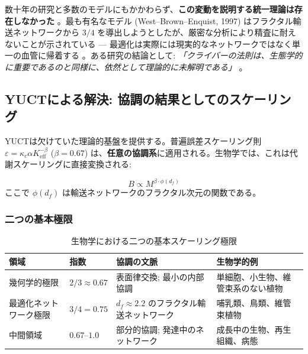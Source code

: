 \documentclass[12pt]{article}
\newcommand{\Keff}{K_{\mathrm{eff}}}
\begin{document}
	数十年の研究と多数のモデルにもかかわらず、\textbf{この変動を説明する統一理論は存在しなかった} \cite{Agutter2004}。最も有名なモデル (West–Brown–Enquist, 1997) はフラクタル輸送ネットワークから \(3/4\) を導出しようとしたが、厳密な分析により精査に耐えないことが示されている — 最適化は実際には現実的なネットワークではなく単一の血管に帰着する \cite{Dodds2001}。ある研究の結論として: \textit{「クライバーの法則は、生態学的に重要であるのと同様に、依然として理論的に未解明である」} \cite{Agutter2004}。
	
	\subsection{YUCTによる解決: 協調の結果としてのスケーリング}
	
	YUCTは欠けていた理論的基盤を提供する。普遍誤差スケーリング則 \(\varepsilon = \kappa_c \alpha \Keff^{-\beta}\) (\(\beta = 0.67\)) は、\textbf{任意の協調系}に適用される。生物学では、これは代謝スケーリングに直接変換される:
	
	\begin{equation}
		B \propto M^{\beta \cdot \phi(d_f)}
	\end{equation}
	ここで \(\phi(d_f)\) は輸送ネットワークのフラクタル次元の関数である。
	
	\subsubsection{二つの基本極限}
	
	\begin{table}[htbp]
		\centering
		\caption{生物学における二つの基本スケーリング極限}
		\label{tab:scaling-limits}
		\footnotesize
		\begin{tabular}{p{3cm} p{1.5cm} p{5cm} p{4cm}}
			\toprule
			\textbf{領域} & \textbf{指数} & \textbf{協調の文脈} & \textbf{生物学的例} \\
			\midrule
			幾何学的極限 & \(2/3 \approx 0.67\) & 表面律交換; 最小の内部協調 & 単細胞、小生物、維管束系のない植物 \cite{Glazier2005,Reich2006} \\
			最適化ネットワーク極限 & \(3/4 = 0.75\) & \(d_f \approx 2.2\) のフラクタル輸送ネットワーク & 哺乳類、鳥類、維管束植物 \cite{West1997} \\
			中間領域 & \(0.67\)–\(1.0\) & 部分的協調; 発達中のネットワーク & 成長中の生物、再生組織、病態 \cite{Glazier2005} \\
			\bottomrule
		\end{tabular}
	\end{table}
	
\end{document}
